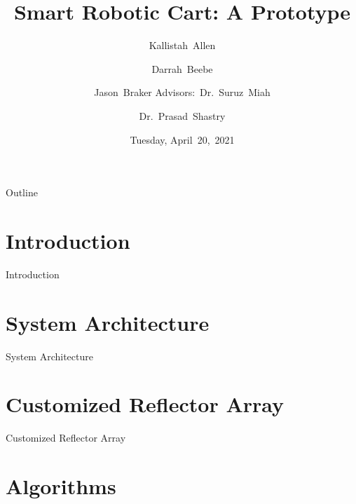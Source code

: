 \documentclass{beamer}
\title[Smart Robotic Cart]{Smart Robotic Cart: A Prototype}
\author[K.~Allen, D.~Beebe, J.~Braker]{Kallistah~Allen \and Darrah~Beebe \and Jason~Braker
Advisors:~Dr.~Suruz~Miah \and Dr.~Prasad~Shastry}
\institute[Bradley University] %
{
  Department of Electrical and Computer Engineering\\
  Bradley University\\
  1501 W. Bradley Avenue\\
  Peoria, IL, 61625, USA
}
\date[April~20,~2021]{Tuesday, April~20,~2021}
\begin{document}
\begin{frame}
  \titlepage
\end{frame}

\begin{frame}{Outline} 
  \tableofcontents%
\end{frame}

\section{Introduction}

\begin{frame}{Introduction}{}

\end{frame}


\section{System Architecture}

\begin{frame}{System Architecture}
  
\end{frame}


\section{Customized Reflector Array}

\begin{frame}{Customized Reflector Array}
  
\end{frame}


\section{Algorithms}
\end{document}
